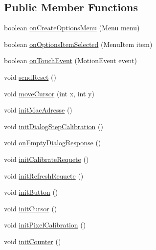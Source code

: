 \subsection*{Public Member Functions}
\begin{DoxyCompactItemize}
\item 
boolean \hyperlink{classcom_1_1example_1_1fabien_1_1lo53__project_1_1MainActivity_adff8bc0d7f447c04b51b445b311d3dcd}{on\-Create\-Options\-Menu} (Menu menu)
\item 
boolean \hyperlink{classcom_1_1example_1_1fabien_1_1lo53__project_1_1MainActivity_a28e11fb5c445043c22ffddd3e9207ada}{on\-Options\-Item\-Selected} (Menu\-Item item)
\item 
boolean \hyperlink{classcom_1_1example_1_1fabien_1_1lo53__project_1_1MainActivity_a3c23459190c309b08aa0c185db2676bc}{on\-Touch\-Event} (Motion\-Event event)
\item 
void \hyperlink{classcom_1_1example_1_1fabien_1_1lo53__project_1_1MainActivity_a31118445953585f2d27b1b9b044e4987}{send\-Reset} ()
\item 
void \hyperlink{classcom_1_1example_1_1fabien_1_1lo53__project_1_1MainActivity_a957f36de03d8e07d8e405568d7b8319d}{move\-Cursor} (int x, int y)
\item 
void \hyperlink{classcom_1_1example_1_1fabien_1_1lo53__project_1_1MainActivity_a64efc7252e031de0bd39476bae4c5752}{init\-Mac\-Adresse} ()
\item 
void \hyperlink{classcom_1_1example_1_1fabien_1_1lo53__project_1_1MainActivity_ade905e90c38949e097e34396cbb49ffa}{init\-Dialog\-Step\-Calibration} ()
\item 
void \hyperlink{classcom_1_1example_1_1fabien_1_1lo53__project_1_1MainActivity_a5571fd0a612074cc7af2f3b2dd1ad45e}{on\-Empty\-Dialog\-Response} ()
\item 
void \hyperlink{classcom_1_1example_1_1fabien_1_1lo53__project_1_1MainActivity_a9f71f4fb957b11c7e2bbca11533f1ae4}{init\-Calibrate\-Requete} ()
\item 
void \hyperlink{classcom_1_1example_1_1fabien_1_1lo53__project_1_1MainActivity_a657b41f3e170fae1cd6a3fae64c28433}{init\-Refresh\-Requete} ()
\item 
void \hyperlink{classcom_1_1example_1_1fabien_1_1lo53__project_1_1MainActivity_aa9be6a48c39c3612ce969eea85173bb4}{init\-Button} ()
\item 
void \hyperlink{classcom_1_1example_1_1fabien_1_1lo53__project_1_1MainActivity_ac7c0fe459218d9d65c3fd2ec696d88e0}{init\-Cursor} ()
\item 
void \hyperlink{classcom_1_1example_1_1fabien_1_1lo53__project_1_1MainActivity_ac08b9664768c62c86b6fb6fe3c5acb83}{init\-Pixel\-Calibration} ()
\item 
void \hyperlink{classcom_1_1example_1_1fabien_1_1lo53__project_1_1MainActivity_a07572b87e5bb5d6fb795194f414f33b3}{init\-Counter} ()
\end{DoxyCompactItemize}
